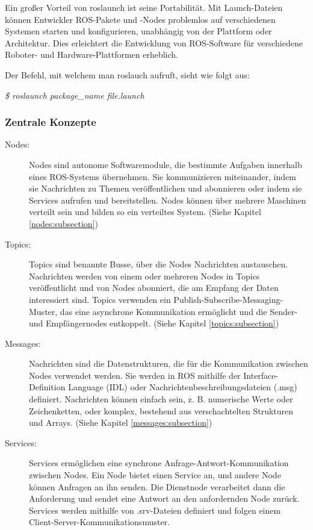     Ein großer Vorteil von roslaunch ist seine Portabilität. Mit Launch-Dateien können Entwickler ROS-Pakete und -Nodes problemlos auf verschiedenen Systemen starten und konfigurieren, unabhängig von der Plattform oder Architektur. Dies erleichtert die Entwicklung von ROS-Software für verschiedene Roboter- und Hardware-Plattformen erheblich. \cite{roslaunch}

    Der Befehl, mit welchem man roslauch aufruft, sieht wie folgt aus:
    
    \textit{\$ roslaunch package\_name file.launch}

\subsubsection{Zentrale Konzepte} \label{zentrale_konzepte:subsubsection}
\begin{description}
    \item[Nodes:] Nodes sind autonome Softwaremodule, die bestimmte Aufgaben innerhalb eines ROS-Systems übernehmen. Sie kommunizieren miteinander, indem sie Nachrichten zu Themen veröffentlichen und abonnieren oder indem sie Services aufrufen und bereitstellen. Nodes können über mehrere Maschinen verteilt sein und bilden so ein verteiltes System. (Siehe Kapitel \ref{nodes:subsection})
    
    \item[Topics:] Topics sind benannte Busse, über die Nodes Nachrichten austauschen. Nachrichten werden von einem oder mehreren Nodes in Topics veröffentlicht und von Nodes abonniert, die am Empfang der Daten interessiert sind. Topics verwenden ein Publish-Subscribe-Messaging-Muster, das eine asynchrone Kommunikation ermöglicht und die Sender- und Empfängernodes entkoppelt. (Siehe Kapitel \ref{topics:subsection})
    
    \item[Messages:] Nachrichten sind die Datenstrukturen, die für die Kommunikation zwischen Nodes verwendet werden. Sie werden in ROS mithilfe der Interface-Definition Language (IDL) oder Nachrichtenbeschreibungsdateien (.msg) definiert. Nachrichten können einfach sein, z. B. numerische Werte oder Zeichenketten, oder komplex, bestehend aus verschachtelten Strukturen und Arrays. (Siehe Kapitel \ref{messages:subsection})
    
    \item[Services:] Services ermöglichen eine synchrone Anfrage-Antwort-Kommunikation zwischen Nodes. Ein Node bietet einen Service an, und andere Node können Anfragen an ihn senden. Die Dienstnode verarbeitet dann die Anforderung und sendet eine Antwort an den anfordernden Node zurück. Services werden mithilfe von .srv-Dateien definiert und folgen einem Client-Server-Kommunikationsmuster.
\end{description}

